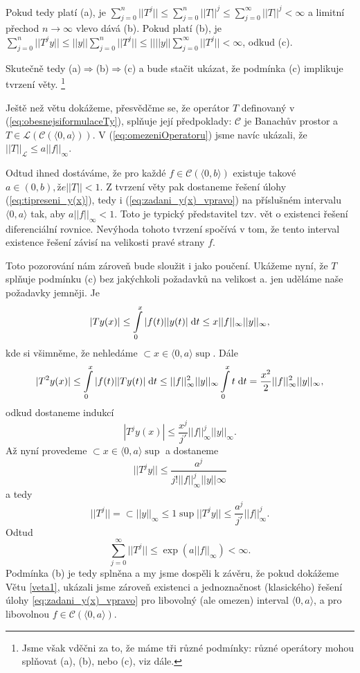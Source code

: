 Pokud tedy platí (a), je $\sum_{j=0}^n||T^j||\leq\sum_{j=0}^n||T||^j\leq \sum_{j=0}^\infty||T||^j<\infty$ a limitní přechod $n\rightarrow \infty$ vlevo dává (b). Pokud platí (b), je $\sum_{j=0}^n||T^jy||\leq||y||\sum_{j=0}^n||T^j||\leq||||y||\sum_{j=0}^\infty||T^j||<\infty$, odkud (c).

Skutečně tedy (a)$\Rightarrow$(b)$\Rightarrow$(c) a bude stačit ukázat, že podmínka (c) implikuje tvrzení věty. \footnote{Jsme však vděčni za to, že máme tři různé podmínky: různé operátory mohou splňovat (a), (b), nebo (c), viz dále.}
\item Ještě než větu dokážeme, přesvědčme se, že operátor $T$ definovaný v (\ref{eq:obesnejsiformulaceTy}), splňuje její předpoklady: $\mathcal{C}$ je Banachův prostor a $T\in\mathscr{L}(\mathcal{C}(\langle0,a\rangle))$. V (\ref{eq:omezeniOperatoru}) jsme navíc ukázali, že $||T||_{\mathscr{L}}\leq a||f||_\infty.$

Odtud ihned dostáváme, že pro každé $f\in\mathcal{C}(\langle0,b\rangle)$ existuje takové $a\in(0,b), že ||T||<1$. Z tvrzení věty pak dostaneme  řešení úlohy (\ref{eq:tipreseni_y(x)}), tedy i (\ref{eq:zadani_y(x)_vpravo}) na příslušném  intervalu $\langle0,a\rangle$ tak, aby $a||f||_\infty<1$. Toto je typický představitel tzv. vět o  existenci řešení diferenciální rovnice. Nevýhoda tohoto tvrzení spočívá v tom, že tento interval existence řešení závisí na velikosti pravé strany $f$.

Toto pozorování nám zároveň bude sloužit i jako poučení. Ukážeme nyní, že $T$ splňuje podmínku (c) bez jakýchkoli požadavků na velikost a. jen uděláme naše požadavky jemněji. Je 
$$|Ty(x)|\leq \int\limits_0^x|f(t)||y(t)|\;\mathrm{d}t\leq x||f||_\infty||y||_\infty,$$
kde si všimněme, že nehledáme $\subset{x\in\langle0,a\rangle}{\sup}$. Dále
$$|T^2y(x)|\leq\int\limits_0^x|f(t)||Ty(t)|\;\mathrm{d}t\leq ||f||^2_\infty||y||_\infty\int\limits_0^xt\;\mathrm{d}t = \frac{x^2}{2}||f||^2_\infty||y||_\infty,$$
odkud dostaneme indukcí
$$|T^jy(x)|\leq\frac{x^j}{j'}||f||^j_\infty||y||_\infty.$$
Až nyní provedeme $\subset{x\in\langle0,a\rangle}{\sup}$ a dostaneme 
$$||T^jy||\leq\frac{a^j}{j!||f||^j_\infty||y||\infty}$$ a tedy 
$$||T^j||=\subset{||y||_\infty\leq 1}{\sup}||T^jy||\leq\frac{a^j}{j'}||f||^j_\infty.$$
Odtud $$\sum\limits_{j=0}^\infty||T^j||\leq\exp(a||f||_\infty)<\infty.$$
Podmínka (b) je tedy splněna a my jsme dospěli k závěru, že pokud dokážeme Větu \ref{veta1}, ukázali jsme zároveň existenci a jednoznačnost (klasického) řešení úlohy \ref{eq:zadani_y(x)_vpravo} pro libovolný (ale omezen) interval $\langle0,a\rangle$, a pro libovolnou $f\in\mathcal{C}(\langle0,a\rangle)$.

